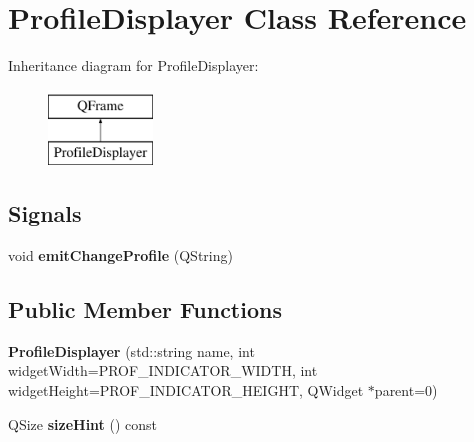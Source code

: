 \hypertarget{class_profile_displayer}{\section{Profile\+Displayer Class Reference}
\label{class_profile_displayer}
}
Inheritance diagram for Profile\+Displayer\+:\begin{figure}[H]
\begin{center}
\leavevmode
\includegraphics[height=2.000000cm]{class_profile_displayer}
\end{center}
\end{figure}
\subsection*{Signals}
\begin{DoxyCompactItemize}
\item 
\hypertarget{class_profile_displayer_af486a2acd152399dfe9c4a3b326ead13}{void {\bfseries emit\+Change\+Profile} (Q\+String)}\label{class_profile_displayer_af486a2acd152399dfe9c4a3b326ead13}

\end{DoxyCompactItemize}
\subsection*{Public Member Functions}
\begin{DoxyCompactItemize}
\item 
\hypertarget{class_profile_displayer_a0a9cf5e9b09969f8031e4c4407deadd0}{{\bfseries Profile\+Displayer} (std\+::string name, int widget\+Width=P\+R\+O\+F\+\_\+\+I\+N\+D\+I\+C\+A\+T\+O\+R\+\_\+\+W\+I\+D\+T\+H, int widget\+Height=P\+R\+O\+F\+\_\+\+I\+N\+D\+I\+C\+A\+T\+O\+R\+\_\+\+H\+E\+I\+G\+H\+T, Q\+Widget $\ast$parent=0)}\label{class_profile_displayer_a0a9cf5e9b09969f8031e4c4407deadd0}

\item 
\hypertarget{class_profile_displayer_a8b66497d9c3add926298e5657d0b0d56}{Q\+Size {\bfseries size\+Hint} () const }\label{class_profile_displayer_a8b66497d9c3add926298e5657d0b0d56}

\end{DoxyCompactItemize}
